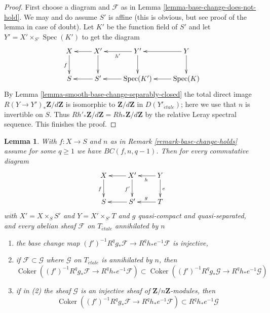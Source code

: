 \documentclass{amsart}
\theoremstyle{plain}
\newtheorem{lemma}[subsection]{Lemma}
\theoremstyle{definition}
\theoremstyle{remark}
\numberwithin{equation}{subsection}
\def\Spec{\mathop{\mathrm{Spec}}}
\def\etale{{\acute{e}tale}}
\def\Coker{\mathop{\mathrm{Coker}}}
\begin{document}
\begin{proof}
First choose a diagram and $\mathcal{F}$ as in
Lemma \ref{lemma-base-change-does-not-hold}.
We may and do assume $S'$ is affine (this is obvious, but
see proof of the lemma in case of doubt).
Let $K'$ be the function field of $S'$
and let $Y' = X' \times_{S'} \Spec(K')$ to get the diagram
$$
\xymatrix{
X \ar[d]_f &
X' \ar[d] \ar[l] &
Y' \ar[l]^{h'} \ar[d] &
Y \ar[l] \ar[d] \\
S &
S' \ar[l] &
\Spec(K') \ar[l] &
\Spec(K) \ar[l]
}
$$
By Lemma \ref{lemma-smooth-base-change-separably-closed}
the total direct image $R(Y \to Y')_*\mathbf{Z}/d\mathbf{Z}$
is isomorphic to $\mathbf{Z}/d\mathbf{Z}$ in $D(Y'_\etale)$; here
we use that $n$ is invertible on $S$.
Thus $Rh'_*\mathbf{Z}/d\mathbf{Z} = Rh_*\mathbf{Z}/d\mathbf{Z}$
by the relative Leray spectral sequence. This finishes the proof.
\end{proof}


\begin{lemma}
\label{lemma-base-change-q-injective}
With $f : X \to S$ and $n$ as in Remark \ref{remark-base-change-holds}
assume for some $q \geq 1$ we have $BC(f, n, q - 1)$. Then
for every commutative diagram
$$
\xymatrix{
X \ar[d]_f & X' \ar[l] \ar[d]_{f'} & Y \ar[l]^h \ar[d]^e \\
S & S' \ar[l] & T \ar[l]_g
}
$$
with $X' = X \times_S S'$ and $Y = X' \times_{S'} T$ and
$g$ quasi-compact and quasi-separated, and every abelian sheaf
$\mathcal{F}$ on $T_\etale$ annihilated by $n$
\begin{enumerate}
\item the base change map
$(f')^{-1}R^qg_*\mathcal{F}\to R^qh_*e^{-1}\mathcal{F}$
is injective,
\item if $\mathcal{F} \subset \mathcal{G}$ where $\mathcal{G}$
on $T_\etale$ is annihilated by $n$, then
$$
\Coker\left(
(f')^{-1}R^qg_*\mathcal{F}\to R^qh_*e^{-1}\mathcal{F}
\right)
\subset
\Coker\left(
(f')^{-1}R^qg_*\mathcal{G}\to R^qh_*e^{-1}\mathcal{G}
\right)
$$
\item if in (2) the sheaf $\mathcal{G}$ is an injective sheaf
of $\mathbf{Z}/n\mathbf{Z}$-modules, then
$$
\Coker\left((f')^{-1}R^qg_*\mathcal{F}\to R^qh_*e^{-1}\mathcal{F} \right)
\subset R^qh_*e^{-1}\mathcal{G}
$$
\end{enumerate}
\end{lemma}
\end{document}
